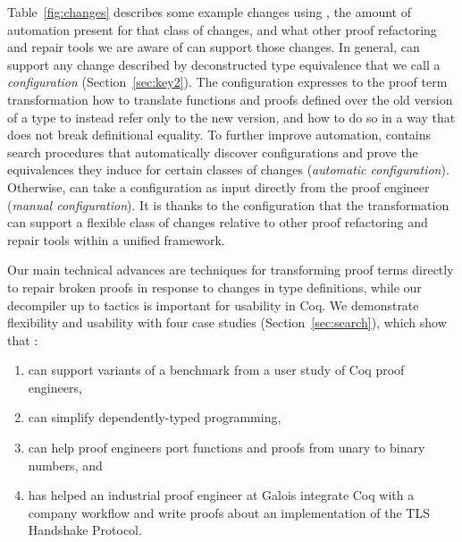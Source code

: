 Table~\ref{fig:changes} describes some example changes using \toolname, the amount of automation present for that class of changes,
and what other proof refactoring and repair tools we are aware of can support those changes.
In general, \toolname can support any change described by deconstructed type equivalence that we call a \textit{configuration} (Section~\ref{sec:key2}).
The configuration expresses to the proof term transformation how to translate functions and proofs defined over the old version of a type
to instead refer only to the new version, and how to do so in a way that does not break definitional equality.
To further improve automation, \toolname contains search procedures that automatically discover configurations and prove the
equivalences they induce for certain classes of changes (\textit{automatic configuration}).
Otherwise, \toolname can take a configuration as input directly from the proof engineer (\textit{manual configuration}).
It is thanks to the configuration that the \toolname transformation can support a flexible class of changes relative to other proof refactoring and repair tools within a unified framework.

Our main technical advances are techniques for transforming proof terms directly to repair broken proofs in response to changes
in type definitions,  while our decompiler up to tactics is important for usability in Coq.
We demonstrate flexibility and usability with four case studies (Section~\ref{sec:search}), which show that \toolname:

\begin{enumerate}
\item can support variants of a benchmark from a user study of Coq proof engineers,
\item can simplify dependently-typed programming, %
\item can help proof engineers port functions and proofs from unary to binary numbers, and
\item has helped an industrial proof engineer at Galois integrate Coq with a company workflow and write proofs about an implementation of the TLS Handshake Protocol.
\end{enumerate}

